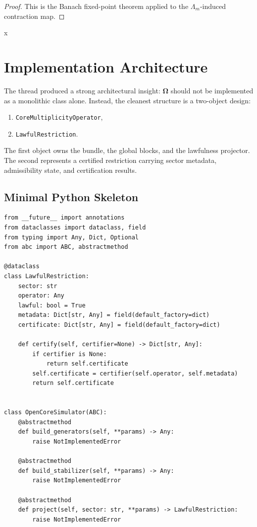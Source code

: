 \documentclass[11pt]{article}
\theoremstyle{plain}
\theoremstyle{definition}
\theoremstyle{remark}
\newcommand{\Om}{\boldsymbol{\Omega}}
\begin{document}
\begin{proof}
This is the Banach fixed-point theorem applied to the \(\Lambda_m\)-induced contraction map.
\end{proof}

x\section{Implementation Architecture}

The thread produced a strong architectural insight: \(\Om\) should not be implemented as a monolithic class alone. Instead, the cleanest structure is a two-object design:
\begin{enumerate}
    \item \texttt{CoreMultiplicityOperator},
    \item \texttt{LawfulRestriction}.
\end{enumerate}

The first object owns the bundle, the global blocks, and the lawfulness projector. The second represents a certified restriction carrying sector metadata, admissibility state, and certification results.

\subsection{Minimal Python Skeleton}

\begin{lstlisting}[style=pythonstyle,caption={Minimal Open Core base class}]
from __future__ import annotations
from dataclasses import dataclass, field
from typing import Any, Dict, Optional
from abc import ABC, abstractmethod

@dataclass
class LawfulRestriction:
    sector: str
    operator: Any
    lawful: bool = True
    metadata: Dict[str, Any] = field(default_factory=dict)
    certificate: Dict[str, Any] = field(default_factory=dict)

    def certify(self, certifier=None) -> Dict[str, Any]:
        if certifier is None:
            return self.certificate
        self.certificate = certifier(self.operator, self.metadata)
        return self.certificate


class OpenCoreSimulator(ABC):
    @abstractmethod
    def build_generators(self, **params) -> Any:
        raise NotImplementedError

    @abstractmethod
    def build_stabilizer(self, **params) -> Any:
        raise NotImplementedError

    @abstractmethod
    def project(self, sector: str, **params) -> LawfulRestriction:
        raise NotImplementedError
\end{lstlisting}
\end{document}
